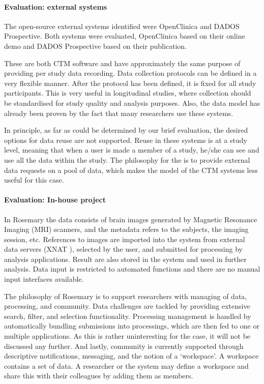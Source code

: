 \paragraph{Evaluation: external systems}
The open-source external systems identified were OpenClinica and DADOS Prospective.
Both systems were evaluated, OpenClinica based on their online demo and DADOS Prospective based on their publication.

These are both CTM software and have approximately the same purpose of providing per study data recording.
Data collection protocols can be defined in a very flexible manner.
After the protocol has been defined, it is fixed for all study participants.
This is very useful in longitudinal studies, where collection should be standardised for study quality and analysis purposes.
Also, the data model has already been proven by the fact that many researchers use these systems.

In principle, as far as could be determined by our brief evaluation, the desired options for data reuse are not supported.
Reuse in these systems is at a study level, meaning that when a user is made a member of a study, he/she can see and use all the data within the study.
The philosophy for the \ivfsystem{} is to provide external data requests on a pool of data, which makes the model of the CTM systems less useful for this case.

\paragraph{Evaluation: In-house project}
In Rosemary the data consists of brain images generated by Magnetic Resonance Imaging (MRI) scanners, and the metadata refers to the subjects, the imaging session, etc. 
References to images are imported into the system from external data servers (XNAT \cite{xnat}), selected by the user, and submitted for processing by analysis applications. 
Result are also stored in the system and used in further analysis.
Data input is restricted to automated functions and there are no manual input interfaces available.

The philosophy of Rosemary is to support researchers with managing of data, processing, and community.
Data challenges are tackled by providing extensive search, filter, and selection functionality.
Processing management is handled by automatically bundling submissions into processings, which are then fed to one or multiple applications. As this is rather uninteresting for the \ivfsystem{} case, it will not be discussed any further.
And lastly, community is currently supported through descriptive notifications, messaging, and the notion of a `workspace'.
A workspace contains a set of data. A researcher or the system may define a workspace and share this with their colleagues by adding them as members.

